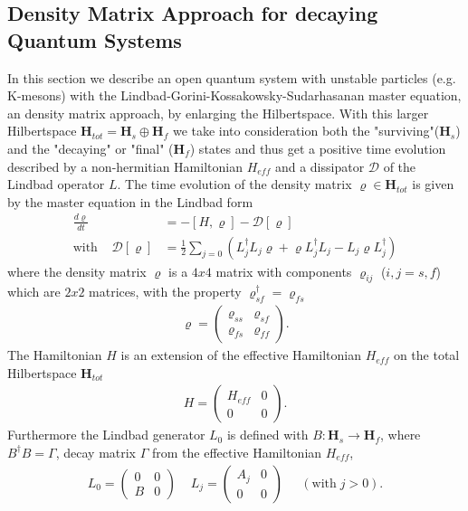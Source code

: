 \documentclass[a4paper]{article}
\begin{document}
\subsection{Density Matrix Approach for decaying Quantum Systems}
In this section we describe an open quantum system with unstable particles
(e.g. K-mesons) with the Lindbad-Gorini-Kossakowsky-Sudarhasanan master equation,
an density matrix approach, by enlarging the Hilbertspace\cite{bgh}. With this
larger Hilbertspace $\textbf{H}_{tot} = \textbf{H}_s \oplus \textbf{H}_f$ we take
into consideration both the "surviving"($\textbf{H}_s$) and the "decaying" or
"final" ($\textbf{H}_f$)
states and thus get a positive time evolution described by a non-hermitian
Hamiltonian $H_{eff}$ and a dissipator $\mathcal{D}$ of the Lindbad operator
$L$. The time evolution of the density matrix $\varrho \in \mathbf{H}_{tot}$ is given by the master
equation in the Lindbad form
\begin{align}\label{eq:master}
    \frac{d\varrho}{dt} &= -[H, \varrho] - \mathcal{D}[\varrho]\\
    \text{with}\;\;\;\;    \mathcal{D}[\varrho] &= \frac{1}{2} \sum_{j=0} (L^{\dagger}_j L_j \varrho + \varrho
    L^{\dagger}_j L_j - L_j \varrho L^{\dagger}_j)
\end{align}
where the density matrix $\varrho$ is a $4x4$ matrix with components
$\varrho_{ij}$ ($i,j = s,f$) which are $2x2$ matrices, with the property
$\varrho^\dagger_{sf} = \varrho_{fs}$
\begin{align}
    \varrho =
    \begin{pmatrix}
        \varrho_{ss} &  \varrho_{sf} \\
        \varrho_{fs} &  \varrho_{ff}
    \end{pmatrix}.
\end{align}
The Hamiltonian $H$ is an extension of the effective Hamiltonian $H_{eff}$ on
the total Hilbertspace $\textbf{H}_{tot}$
\begin{align}
    H =
    \begin{pmatrix}
        H_{eff} &  0 \\
        0 &  0
    \end{pmatrix}.
\end{align}
Furthermore the Lindbad generator $L_0$ is defined with
$B:\textbf{H}_s \rightarrow \textbf{H}_f$, where $B^\dagger B = \Gamma$, decay
matrix $\Gamma$ from the effective Hamiltonian $H_{eff}$,
\begin{align}
    L_0 =
    \begin{pmatrix}
        0 &  0 \\
        B &  0
    \end{pmatrix} \;\;\;\;
    L_j =
    \begin{pmatrix}
        A_j &  0 \\
        0 &  0
    \end{pmatrix} \;\;\;\;\;  (\text{with}\; j > 0).
\end{align}
\end{document}
